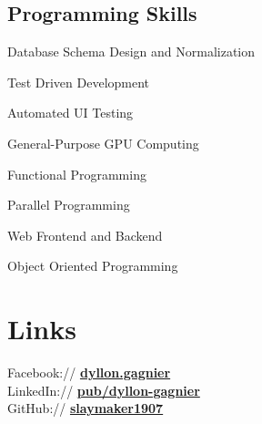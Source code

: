 \documentclass[letterpaper]{deedy-resume} %
\begin{document}
\begin{minipage}[t]{0.35\textwidth}
\subsection{Programming Skills}
\begin{tightitemize}
\vspace{\topsep} %
\item Database Schema Design and Normalization
\item Test Driven Development
\item Automated UI Testing
\item General-Purpose GPU Computing
\item Functional Programming
\item Parallel Programming
\item Web Frontend and Backend
\item Object Oriented Programming
\end{tightitemize}

\sectionspace %


\section{Links}

Facebook:// \href{https://www.facebook.com/dyllon.gagnier}{\bf dyllon.gagnier} \\
LinkedIn:// \href{http://www.linkedin.com/pub/dyllon-gagnier/2a/6b3/808/}{\bf pub/dyllon-gagnier} \\
GitHub:// \href{https://github.com/}{\bf slaymaker1907} \\

\sectionspace %


\end{minipage} %
\hfill
%
%
\end{document}
